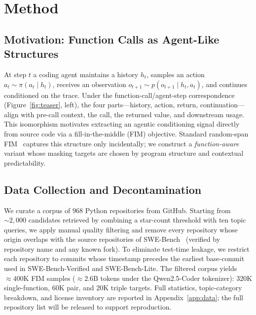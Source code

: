 
\section{Method}
\label{sec:method}
\vspace{-0.5ex}

\subsection{Motivation: Function Calls as Agent-Like Structures}
\label{sec:method:motivation}

At step $t$ a coding agent maintains a history $h_t$, samples an action
$a_t \sim \pi(a_t \mid h_t)$, receives an observation
$o_{t+1} \sim p(o_{t+1} \mid h_t, a_t)$, and continues conditioned on the
trace. Under the function-call/agent-step correspondence
(Figure~\ref{fig:teaser}, left), the four parts---history, action, return,
continuation---align with pre-call context, the call, the returned value,
and downstream usage. This isomorphism motivates extracting an agentic
conditioning signal directly from source code via a fill-in-the-middle
(FIM) objective. Standard random-span FIM~\citep{qwencoder, deepseekcoder,
starcoder} captures this structure only incidentally; we construct a
\emph{function-aware} variant whose masking targets are chosen by program
structure and contextual predictability.

\vspace{-0.5ex}
\subsection{Data Collection and Decontamination}
\label{sec:method:data}

We curate a corpus of $968$ Python repositories from GitHub. Starting
from $\sim\!2{,}000$ candidates retrieved by combining a star-count
threshold with ten topic queries, we apply manual quality filtering and
remove every repository whose origin overlaps with the source
repositories of SWE-Bench~\citep{swebench} (verified by repository name
and any known fork). To eliminate test-time leakage, we restrict each
repository to commits whose timestamp precedes the earliest base-commit
used in SWE-Bench-Verified and SWE-Bench-Lite. The filtered corpus
yields $\approx\!400\mathrm{K}$ FIM samples ($\approx\!2.6\mathrm{B}$
tokens under the Qwen2.5-Coder tokenizer): $320\mathrm{K}$
single-function, $60\mathrm{K}$ pair, and $20\mathrm{K}$ triple targets.
Full statistics, topic-category breakdown, and license inventory are
reported in Appendix~\ref{app:data}; the full repository list will be
released to support reproduction.

